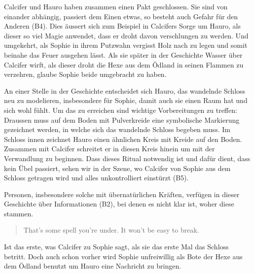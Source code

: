 Calcifer und Hauro haben zusammen einen Pakt geschlossen. Sie sind von einander abhängig, passiert dem Einen etwas, so besteht auch Gefahr für den Anderen (B4). Dies äussert sich zum Beispiel in Calcifers Sorge um Hauro, als dieser so viel Magie anwendet, dass er droht davon verschlungen zu werden. Und umgekehrt, als Sophie in ihrem Putzwahn vergisst Holz nach zu legen und somit beinahe das Feuer ausgehen lässt. Als sie später in der Geschichte Wasser über Calcifer wirft, als dieser droht die Hexe aus dem Ödland in seinen Flammen zu verzehren, glaube Sophie beide umgebracht zu haben.

An einer Stelle in der Geschichte entscheidet sich Hauro, das wandelnde Schloss neu zu modelieren, insbesondere für Sophie, damit auch sie einen Raum hat und sich wohl fühlt. Um das zu erreichen sind wichtige Vorbereitungen zu treffen: Draussen muss auf dem Boden mit Pulverkreide eine symbolische Markierung gezeichnet werden, in welche sich das wandelnde Schloss begeben muss. Im Schloss innen zeichnet Hauro einen ähnlichen Kreis mit Kreide auf den Boden. Zusammen mit Calcifer schreitet er in diesen Kreis hinein um mit der Verwandlung zu beginnen. Dass dieses Ritual notwendig ist und dafür dient, dass kein Übel passiert, sehen wir in der Szene, wo Calcifer von Sophie aus dem Schloss getragen wird und alles unkontrolliert einstürzt (B5).

Personen, insbesondere solche mit übernatürlichen Kräften, verfügen in dieser Geschichte über Informationen (B2), bei denen es nicht klar ist, woher diese stammen.\begin{quote} \glqq That's some spell you're under. It won't be easy to break.\grqq \end{quote} Ist das erste, was Calcifer zu Sophie sagt, als sie das erste Mal das Schloss betritt. Doch auch schon vorher wird Sophie unfreiwillig als Bote der Hexe aus dem Ödland benutzt um Hauro eine Nachricht zu bringen. 